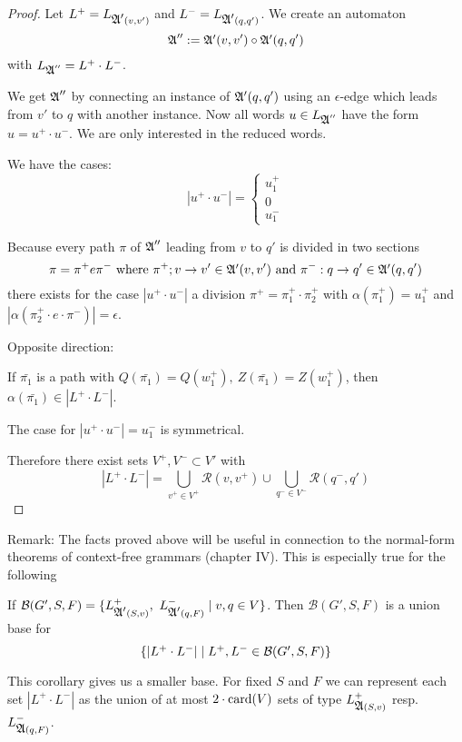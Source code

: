 \begin{proof}
Let $L^+ = L_{\mbox{$\mathfrak{A'}$}(v, v')}$ and $L^- = L_{\mbox{$\mathfrak{A'}$}(q, q')}$. We create an
automaton
\[ \mbox{$\mathfrak{A}$}'' := \mbox{$\mathfrak{A'}$}(v, v') \circ \mbox{$\mathfrak{A'}$}(q, q') \]
with $L_{\mbox{$\mathfrak{A}$}''} = L^+ \cdot L^-$.

We get $\mbox{$\mathfrak{A}$}''$ by connecting an instance of $\mbox{$\mathfrak{A'}$}(q, q')$ using an
$\epsilon$-edge which leads from $v'$ to $q$ with another instance. Now all
words $u \in L_{\mbox{$\mathfrak{A}$}''}$ have the form $u = u^+ \cdot u^-$. We are only
interested in the reduced words.

We have the cases:
\[ |u^+ \cdot u^-| = \begin{cases} u_1^+ \\ 0 \\ u_1^- \end{cases} \]

Because every path $\pi$ of $\mbox{$\mathfrak{A}$}''$ leading from $v$ to $q'$ is divided in
two sections
\[ \pi = \pi^+ e \pi^- \text{ where }\pi^+; v \to v' \in \mbox{$\mathfrak{A'}$}(v, v') \text{
and }\pi^- : q \to q' \in \mbox{$\mathfrak{A'}$}(q, q') \]
there exists for the case $|u^+ \cdot u^-|$ a division $\pi^+ = \pi_1^+ \cdot
\pi_2^+$ with $\alpha(\pi_1^+) = u_1^+$ and $|\alpha(\pi_2^+ \cdot e \cdot
\pi^-)| = \epsilon$.

Opposite direction:

If $\bar{\pi_1}$ is a path with $Q(\bar{\pi_1}) = Q(w_1^+),\ Z(\bar{\pi_1}) =
Z(w_1^+)$, then $\alpha(\bar{\pi_1}) \in |L^+ \cdot L^-|$.

The case for $|u^+ \cdot u^-| = u_1^-$ is symmetrical.

Therefore there exist sets $V^+, V^- \subset V'$ with
\[ |L^+ \cdot L^-| = \bigcup_{v^+ \in V^+} \mathcal{R}(v, v^+) \cup
\bigcup_{q^- \in V^-} \mathcal{R}(q^-, q') \]
\end{proof}

Remark: The facts proved above will be useful in connection to the normal-form
theorems of context-free grammars (chapter IV). This is especially true for the
following

\begin{corollary}
If $\mathcal{B}(G', S, F) = \mbox{$\{L^+_{\mbox{$\mathfrak{A'}$}(S, v)},\ L^-_{\mbox{$\mathfrak{A'}$}(q, F)}
\mid v, q \in V\}$}$. Then $\mathcal{B}(G', S, F)$ is a union base for
\[ \mbox{$\{|L^+ \cdot L^-| \mid L^+, L^- \in \mathcal{B}(G', S, F)\}$} \]
\end{corollary}

This corollary gives us a smaller base. For fixed $S$ and $F$ we can represent
each set $|L^+ \cdot L^-|$ as the union of at most $2 \cdot \mathrm{card}(V)$ sets of
type $L^+_{\mbox{$\mathfrak{A}$}(S, v)}$ resp.\ $L^-_{\mbox{$\mathfrak{A}$}(q, F)}$.

